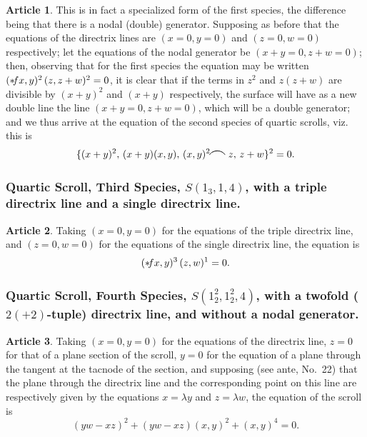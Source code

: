\documentclass[12pt,a4paper]{article}
\theoremstyle{definition}
\newtheorem{art}{Article}[section]
\begin{document}
\begin{art}
This is in fact a specialized form of the first species, the difference being that there is a nodal (double) generator. Supposing as before that the equations of the directrix lines are $(x = 0, y = 0)$ and $(z = 0, w = 0)$ respectively; let the equations of the nodal generator be $(x + y = 0, z + w = 0)$; then, observing that for the first species the equation may be written $(* \hspace{-2pt} fx, y)^2 \, (z, z + w)^2 = 0$, it is clear that if the terms in $z^2$ and $z(z + w)$ are divisible by $(x + y)^2$ and $(x + y)$ respectively, the surface will have as a new double line the line $(x + y = 0, z + w = 0)$, which will be a double generator; and we thus arrive at the equation of the second species of quartic scrolls, viz. this is
\[
\{(x + y)^2, \, (x + y)(x, y), \, (x, y)^2 \hspace{-2pt} \resizebox{!}{1.5ex}{$\frown$} \hspace{2pt} z, \, z + w\}^2 = 0.
\]
\end{art}

\subsubsection*{Quartic Scroll, Third Species, $S(1_3, 1, 4)$, with a triple directrix line and a single directrix line.}

\begin{art}
Taking $(x = 0, y = 0)$ for the equations of the triple directrix line, and $(z = 0, w = 0)$ for the equations of the single directrix line, the equation is
\[
(* \hspace{-2pt} fx, y)^3 \, (z, w)^1 = 0.
\]
\end{art}

\subsubsection*{Quartic Scroll, Fourth Species, $S(1_2^2, 1_2^2, 4)$, with a twofold ($2 (+ 2)$-tuple) directrix line, and without a nodal generator.}

\begin{art}
Taking $(x = 0, y = 0)$ for the equations of the directrix line, $z = 0$ for that of a plane section of the scroll, $y = 0$ for the equation of a plane through the tangent at the tacnode of the section, and supposing (see ante, No.~22) that the plane through the directrix line and the corresponding point on this line are respectively given by the equations $x = \lambda y$ and $z = \lambda w$, the equation of the scroll is
\[
(yw - xz)^2 + (yw - xz)(x, y)^2 + (x, y)^4 = 0.
\]
\end{art}
\end{document}
